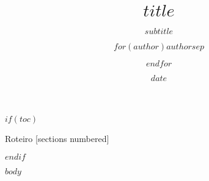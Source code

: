 \documentclass[10pt]{beamer}
\title{$title$}
\subtitle{$subtitle$}
\author{$for(author)$$author$$sep$ \and $endfor$}
\institute{$institute$}
\date{$date$}
\begin{document}
\maketitle

$if(toc)$
\begin{frame}{Roteiro}
[sections numbered]
\tableofcontents[hideallsubsections]
\end{frame}
$endif$

$body$
\end{document}
